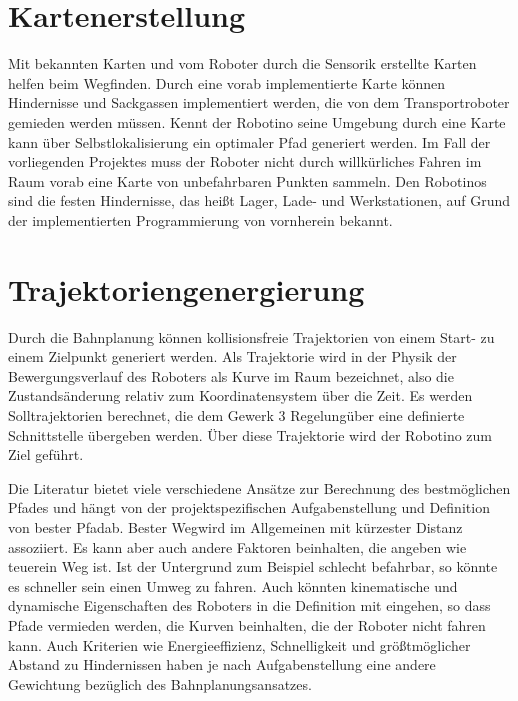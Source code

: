\section{Kartenerstellung}
Mit bekannten Karten und vom Roboter durch die Sensorik erstellte Karten helfen beim Wegfinden. Durch eine vorab implementierte Karte können Hindernisse und Sackgassen implementiert werden, die von dem Transportroboter gemieden werden müssen. Kennt der Robotino seine Umgebung durch eine Karte kann über Selbstlokalisierung ein optimaler Pfad generiert werden. Im Fall der vorliegenden Projektes muss der Roboter nicht durch willkürliches Fahren im Raum vorab eine Karte von unbefahrbaren Punkten sammeln. Den Robotinos sind die festen Hindernisse, das heißt Lager, Lade- und Werkstationen, auf Grund der implementierten Programmierung von vornherein bekannt.
\section{Trajektoriengenergierung}
Durch die Bahnplanung können kollisionsfreie Trajektorien von einem Start- zu einem Zielpunkt generiert werden. Als Trajektorie wird in der Physik der Bewergungsverlauf des Roboters als Kurve im Raum bezeichnet, also die Zustandsänderung relativ zum Koordinatensystem über die Zeit. Es werden Solltrajektorien berechnet, die dem Gewerk 3 \glqq Regelung\grqq über eine definierte Schnittstelle übergeben werden. Über diese Trajektorie wird der Robotino zum Ziel geführt.

Die Literatur bietet viele verschiedene Ansätze zur Berechnung des bestmöglichen Pfades und hängt von der projektspezifischen Aufgabenstellung und Definition von \glqq bester Pfad\grqq ab. \glqq Bester Weg\grqq wird im Allgemeinen mit kürzester Distanz assoziiert. Es kann aber auch andere Faktoren beinhalten, die angeben wie \glqq teuer\grqq ein Weg ist. Ist der Untergrund zum Beispiel schlecht befahrbar, so könnte es schneller sein einen Umweg zu fahren. Auch könnten kinematische und dynamische Eigenschaften des Roboters in die Definition mit eingehen, so dass Pfade vermieden werden, die Kurven beinhalten, die der Roboter nicht fahren kann. Auch Kriterien wie Energieeffizienz, Schnelligkeit und größtmöglicher Abstand zu Hindernissen haben je nach Aufgabenstellung eine andere Gewichtung bezüglich des Bahnplanungsansatzes.


